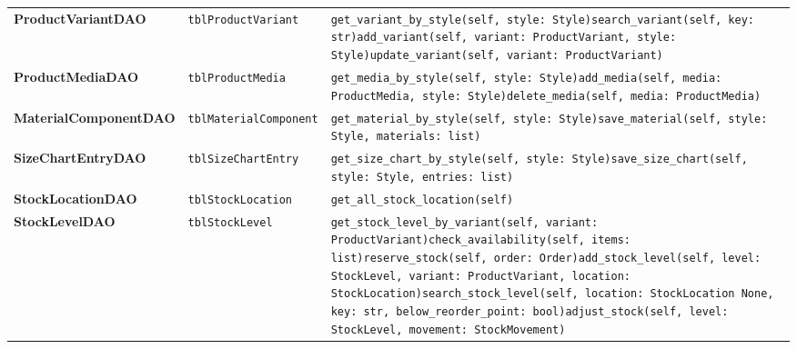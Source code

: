 {\begin{xltabular}{\textwidth}{@{}L{3.5cm} L{3.4cm} Y@{}}
\textbf{ProductVariantDAO} & \texttt{tblProductVariant} & \texttt{get\_\allowbreak{}variant\_\allowbreak{}by\_\allowbreak{}style(self,\allowbreak{} style: Style)}\newline \texttt{search\_\allowbreak{}variant(self,\allowbreak{} key: str)}\newline \texttt{add\_\allowbreak{}variant(self,\allowbreak{} variant: ProductVariant,\allowbreak{} style: Style)}\newline \texttt{update\_\allowbreak{}variant(self,\allowbreak{} variant: ProductVariant)} \\
\textbf{ProductMediaDAO} & \texttt{tblProductMedia} & \texttt{get\_\allowbreak{}media\_\allowbreak{}by\_\allowbreak{}style(self,\allowbreak{} style: Style)}\newline \texttt{add\_\allowbreak{}media(self,\allowbreak{} media: ProductMedia,\allowbreak{} style: Style)}\newline \texttt{delete\_\allowbreak{}media(self,\allowbreak{} media: ProductMedia)} \\
\textbf{MaterialComponentDAO} & \texttt{tblMaterialComponent} & \texttt{get\_\allowbreak{}material\_\allowbreak{}by\_\allowbreak{}style(self,\allowbreak{} style: Style)}\newline \texttt{save\_\allowbreak{}material(self,\allowbreak{} style: Style,\allowbreak{} materials: list)} \\
\textbf{SizeChartEntryDAO} & \texttt{tblSizeChartEntry} & \texttt{get\_\allowbreak{}size\_\allowbreak{}chart\_\allowbreak{}by\_\allowbreak{}style(self,\allowbreak{} style: Style)}\newline \texttt{save\_\allowbreak{}size\_\allowbreak{}chart(self,\allowbreak{} style: Style,\allowbreak{} entries: list)} \\
\textbf{StockLocationDAO} & \texttt{tblStockLocation} & \texttt{get\_\allowbreak{}all\_\allowbreak{}stock\_\allowbreak{}location(self)} \\
\textbf{StockLevelDAO} & \texttt{tblStockLevel} & \texttt{get\_\allowbreak{}stock\_\allowbreak{}level\_\allowbreak{}by\_\allowbreak{}variant(self,\allowbreak{} variant: ProductVariant)}\newline \texttt{check\_\allowbreak{}availability(self,\allowbreak{} items: list)}\newline \texttt{reserve\_\allowbreak{}stock(self,\allowbreak{} order: Order)}\newline \texttt{add\_\allowbreak{}stock\_\allowbreak{}level(self,\allowbreak{} level: StockLevel,\allowbreak{} variant: ProductVariant,\allowbreak{} location: StockLocation)}\newline \texttt{search\_\allowbreak{}stock\_\allowbreak{}level(self,\allowbreak{} location: StockLocation \textbar{} None,\allowbreak{} key: str,\allowbreak{} below\_\allowbreak{}reorder\_\allowbreak{}point: bool)}\newline \texttt{adjust\_\allowbreak{}stock(self,\allowbreak{} level: StockLevel,\allowbreak{} movement: StockMovement)} \\

\end{xltabular}}
